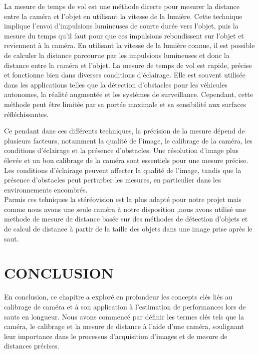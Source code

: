 \begin{itemize}[label={\Huge$\star$}]
 	La mesure de temps de vol est une méthode directe pour mesurer la distance entre la caméra et l'objet en utilisant la vitesse de la lumière. Cette technique implique l'envoi d'impulsions lumineuses de courte durée vers l'objet, puis la mesure du temps qu'il faut pour que ces impulsions rebondissent sur l'objet et reviennent à la caméra. En utilisant la vitesse de la lumière connue, il est possible de calculer la distance parcourue par les impulsions lumineuses et donc la distance entre la caméra et l'objet. La mesure de temps de vol est rapide, précise et fonctionne bien dans diverses conditions d'éclairage. Elle est souvent utilisée dans les applications telles que la détection d'obstacles pour les véhicules autonomes, la réalité augmentée et les systèmes de surveillance. Cependant, cette méthode peut être limitée par sa portée maximale et sa sensibilité aux surfaces réfléchissantes.

 \end{itemize}

Ce pendant dans ces différents techniques, la précision de la mesure dépend de plusieurs facteurs, notamment la qualité de l'image, le calibrage de la caméra, les conditions d'éclairage et la présence d'obstacles. Une résolution d'image plus élevée et un bon calibrage de la caméra sont essentiels pour une mesure précise. Les conditions d'éclairage peuvent affecter la qualité de l'image, tandis que la présence d'obstacles peut perturber les mesures, en particulier dans les environnements encombrés.\\

Parmis ces tehniques la stéréovision est la plus adapté pour notre projet mais comme nous avons une seule caméra à notre disposition ,nous avons utilisé une methode de mesure de distance basée sur des méthodes de détection d'objets et de calcul de distance à partir de la taille des objets dans une image prise après le saut.


\newpage
\section{CONCLUSION}

En conclusion, ce chapitre a exploré en profondeur les concepts clés liés au calibrage de caméra et à son application à l'estimation de performances lors de sauts en longueur. Nous avons commencé par définir les termes clés tels que la caméra, le calibrage et la mesure de distance à l'aide d'une caméra, soulignant leur importance dans le processus d'acquisition d'images et de mesure de distances précises.


